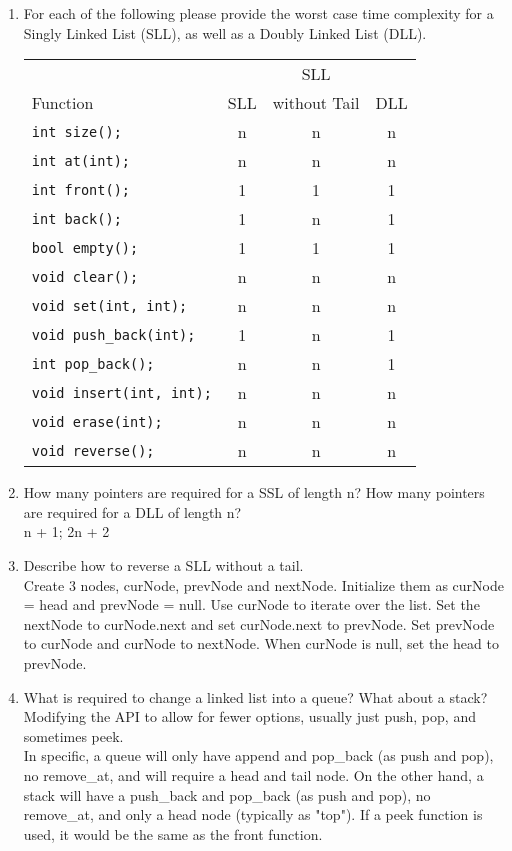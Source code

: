 \documentclass[11pt]{article}
\begin{document}
    \begin{enumerate}
        \item For each of the following please provide the worst case time complexity for a Singly Linked List (SLL), as well as a Doubly Linked List (DLL). 
    
    \begin{tabular}{l | c | c | c}
                 &     & SLL          &  \\ 
        Function & SLL & without Tail & DLL \\ \hline
        \verb|int size();| & n & n & n \\ \hline
        \verb|int at(int);| & n & n & n \\ \hline
        \verb|int front();| & 1 & 1 & 1 \\ \hline
        \verb|int back();| & 1 & n & 1 \\ \hline
        \verb|bool empty();| & 1 & 1 & 1 \\ \hline
        \verb|void clear();| & n & n & n \\ \hline
        \verb|void set(int, int);| & n & n & n \\ \hline
        \verb|void push_back(int);| & 1 & n & 1 \\ \hline
        \verb|int pop_back();| & n & n & 1 \\ \hline
        \verb|void insert(int, int);| & n & n & n \\ \hline
        \verb|void erase(int);| & n & n & n \\ \hline
        \verb|void reverse();| & n & n & n \\ \hline
    \end{tabular}
    
        \item How many pointers are required for a SSL of length n? How many pointers are required for a DLL of length n?\\
        n + 1; 2n + 2
        
        \item Describe how to reverse a SLL without a tail.\\
        Create 3 nodes, curNode, prevNode and nextNode. Initialize them as curNode = head and prevNode = null. Use curNode to iterate over the list. Set the nextNode to curNode.next and set curNode.next to prevNode. Set prevNode to curNode and curNode to nextNode. When curNode is null, set the head to prevNode.
        
        \item What is required to change a linked list into a queue? What about a stack?\\
        Modifying the API to allow for fewer options, usually just push, pop, and sometimes peek.\\
        In specific, a queue will only have append and pop\_back (as push and pop), no remove\_at, and will require a head and tail node. On the other hand, a stack will have a push\_back and pop\_back (as push and pop), no remove\_at, and only a head node (typically as "top"). If a peek function is used, it would be the same as the front function.
        

\end{enumerate}
\end{document}
